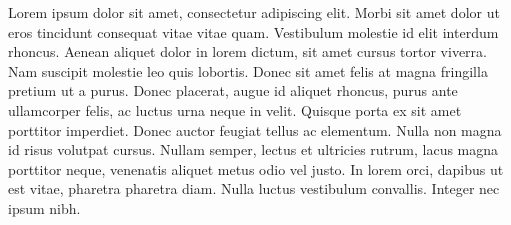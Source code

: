 \begin{resumoingles}
    Lorem ipsum dolor sit amet, consectetur adipiscing elit. Morbi sit amet dolor ut eros tincidunt consequat vitae vitae quam. Vestibulum molestie id elit interdum rhoncus. Aenean aliquet dolor in lorem dictum, sit amet cursus tortor viverra. Nam suscipit molestie leo quis lobortis. Donec sit amet felis at magna fringilla pretium ut a purus. Donec placerat, augue id aliquet rhoncus, purus ante ullamcorper felis, ac luctus urna neque in velit. Quisque porta ex sit amet porttitor imperdiet. Donec auctor feugiat tellus ac elementum. Nulla non magna id risus volutpat cursus. Nullam semper, lectus et ultricies rutrum, lacus magna porttitor neque, venenatis aliquet metus odio vel justo. In lorem orci, dapibus ut est vitae, pharetra pharetra diam. Nulla luctus vestibulum convallis. Integer nec ipsum nibh.
\end{resumoingles}

